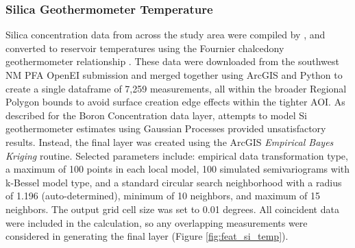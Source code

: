 \subsubsection{Silica Geothermometer Temperature}

Silica concentration data from across the study area were compiled by \citet{bielicki_hydrogeolgic_2015}, and converted to reservoir temperatures using the Fournier chalcedony geothermometer relationship \citep{fournier_chemical_1977}. These data were downloaded from the southwest NM PFA OpenEI submission \citep{kelley_geothermal_2015} and merged together using ArcGIS and Python to create a single dataframe of 7,259 measurements, all within the broader Regional Polygon bounds to avoid surface creation edge effects within the tighter AOI. As described for the Boron Concentration data layer, attempts to model Si geothermometer estimates using Gaussian Processes provided unsatisfactory results. Instead, the final layer was created using the ArcGIS \textit{Empirical Bayes Kriging} routine. Selected parameters include: empirical data transformation type, a maximum of 100 points in each local model, 100 simulated semivariograms with k-Bessel model type, and a standard circular search neighborhood with a radius of 1.196 (auto-determined), minimum of 10 neighbors, and maximum of 15 neighbors. The output grid cell size was set to 0.01 degrees. All coincident data were included in the calculation, so any overlapping measurements were considered in generating the final layer (Figure \ref{fig:feat_si_temp}).


